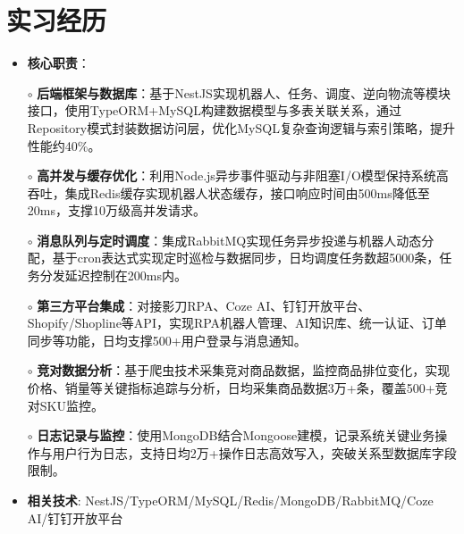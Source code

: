 \section{实习经历}
  \begin{normalsize}
    \begin{itemize}
    \item \textbf{核心职责}：
    \setlength{\itemindent}{1em} %
      \item[$\circ$] \textbf{后端框架与数据库}：基于NestJS实现机器人、任务、调度、逆向物流等模块接口，使用TypeORM+MySQL构建数据模型与多表关联关系，通过Repository模式封装数据访问层，优化MySQL复杂查询逻辑与索引策略，提升性能约40\%。
      \item[$\circ$] \textbf{高并发与缓存优化}：利用Node.js异步事件驱动与非阻塞I/O模型保持系统高吞吐，集成Redis缓存实现机器人状态缓存，接口响应时间由500ms降低至20ms，支撑10万级高并发请求。
      \item[$\circ$] \textbf{消息队列与定时调度}：集成RabbitMQ实现任务异步投递与机器人动态分配，基于cron表达式实现定时巡检与数据同步，日均调度任务数超5000条，任务分发延迟控制在200ms内。
      \item[$\circ$] \textbf{第三方平台集成}：对接影刀RPA、Coze AI、钉钉开放平台、Shopify/Shopline等API，实现RPA机器人管理、AI知识库、统一认证、订单同步等功能，日均支撑500+用户登录与消息通知。
      \item[$\circ$] \textbf{竞对数据分析}：基于爬虫技术采集竞对商品数据，监控商品排位变化，实现价格、销量等关键指标追踪与分析，日均采集商品数据3万+条，覆盖500+竞对SKU监控。
      \item[$\circ$] \textbf{日志记录与监控}：使用MongoDB结合Mongoose建模，记录系统关键业务操作与用户行为日志，支持日均2万+操作日志高效写入，突破关系型数据库字段限制。
    \setlength{\itemindent}{0em} %
    \item \textbf{相关技术}: NestJS/TypeORM/MySQL/Redis/MongoDB/RabbitMQ/Coze AI/钉钉开放平台
    \end{itemize}
  \end{normalsize}
